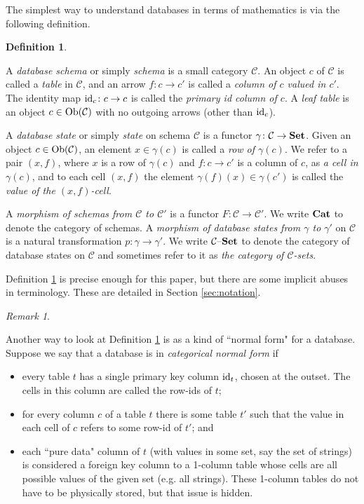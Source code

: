 \documentclass{amsart}
\def\tn{\textnormal}
\def\mc{\mathcal}
\def\Ob{\tn{Ob}}
\def\to{\rightarrow}
\def\taking{\colon}
\def\id{\tn{id}}
\def\Cat{{\bf Cat}}
\def\Set{{\bf Set}}
\def\set{{\text \textendash}{\bf Set}}
\def\mcC{\mc{C}}
\theoremstyle{remark}
\newtheorem{remark}[theorem]{Remark}
\theoremstyle{definition}
\newtheorem{definition}[theorem]{Definition}
\begin{document}
The simplest way to understand databases in terms of mathematics is via the following definition.

\begin{definition} \label{def:basic}

A {\em database schema} or simply {\em schema} is a small category $\mcC$.   An object $c$ of $\mcC$ is called a {\em table} in $\mcC$, and an arrow $f\taking c\to c'$ is called a {\em column of $c$ valued in $c'$}.  The identity map $\id_c\taking c\to c$ is called the {\em primary id column of $c$}.  A {\em leaf table} is an object $c\in\Ob(\mcC)$ with no outgoing arrows (other than $\id_c$).

A {\em database state} or simply {\em state} on schema $\mcC$ is a functor $\gamma\taking\mcC\to\Set$.   Given an object $c\in\Ob(\mcC)$, an element $x\in\gamma(c)$ is called a {\em row of $\gamma(c)$}.  We refer to a pair $(x,f)$, where $x$ is a row of $\gamma(c)$ and $f\taking c\to c'$ is a column of $c$, as {\em a cell in $\gamma(c)$}, and to each cell $(x,f)$ the element $\gamma(f)(x)\in\gamma(c')$ is called the {\em value of the $(x,f)$-cell}.

A {\em morphism of schemas from $\mcC$ to $\mcC'$} is a functor $F\taking\mcC\to\mcC'$.  We write $\Cat$ to denote the category of schemas.  A {\em morphism of database states from $\gamma$ to $\gamma'$} on $\mcC$ is a natural transformation $p\taking\gamma\to\gamma'$.  We write $\mcC\set$ to denote the category of database states on $\mcC$ and sometimes refer to it as {\em the category of $\mcC$-sets}. 

\end{definition}

Definition \ref{def:basic} is precise enough for this paper, but there are some implicit abuses in terminology.  These are detailed in Section \ref{sec:notation}.

\begin{remark}\label{rem:cnf}

Another way to look at Definition \ref{def:basic} is as a kind of ``normal form" for a database.  Suppose we say that a database is in {\em categorical normal form} if \begin{itemize}\item every table $t$ has a single primary key column $\id_t$, chosen at the outset.  The cells in this column are called the row-ids of $t$;\item for every column $c$ of a table $t$ there is some table $t'$ such that the value in each cell of $c$ refers to some row-id of $t'$; and \item each ``pure data" column of $t$ (with values in some set, say the set of strings) is considered a foreign key column to a 1-column table whose cells are all possible values of the given set (e.g. all strings).  These 1-column tables do not have to be physically stored, but that issue is hidden.\end{itemize}

\end{remark}
\end{document}
